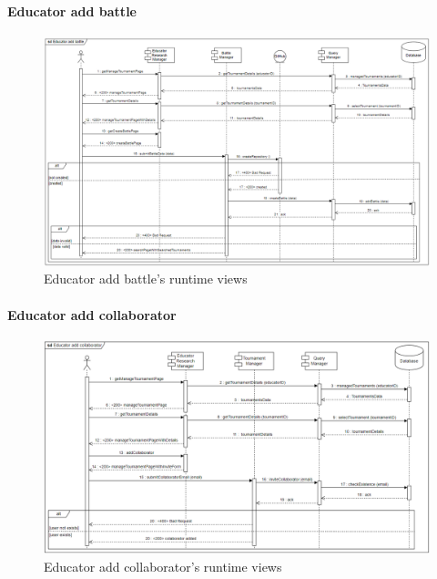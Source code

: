 \documentclass[12pt, a4paper]{report}
\begin{document}
    \paragraph*{Educator add battle}
    \begin{figure}[H]
        \centering
        \includegraphics[width=1.0\linewidth]{images/eabrv.png}
        \caption{Educator add battle's runtime views}
    \end{figure}

    \paragraph*{Educator add collaborator}
    \begin{figure}[H]
        \centering
        \includegraphics[width=1.0\linewidth]{images/eacrv.png}
        \caption{Educator add collaborator's runtime views}
    \end{figure}
\end{document}
